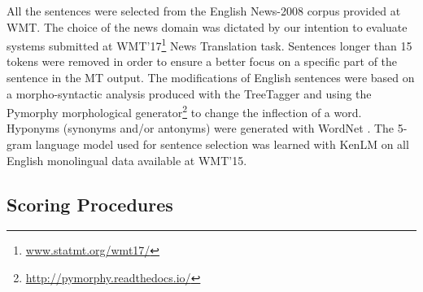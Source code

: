\documentclass[11pt,letterpaper,final,nohyperref]{article}
\begin{document}
All the sentences were selected
from the English News-2008 corpus provided
at WMT. The choice of the news domain was dictated by our intention
to evaluate systems submitted at WMT'17\footnote{\url{www.statmt.org/wmt17/}} News Translation task.
Sentences longer than 15 tokens were removed in order to ensure a
better focus on a specific part of the sentence in the
MT output.
The modifications of English sentences were based on a morpho-syntactic analysis produced with the TreeTagger \cite{Schmid94pos}
and using the Pymorphy morphological generator\footnote{\url{http://pymorphy.readthedocs.io/}}
to change the inflection of a word. Hyponyms (synonyms and/or antonyms) were generated with WordNet \cite{miller95wordnet}.
The 5-gram language model used for sentence selection was learned with KenLM \cite{Heafield11kenlm} on all English monolingual data available at WMT'15. %

\subsection{Scoring Procedures \label{ssec:scoring}}
\end{document}
